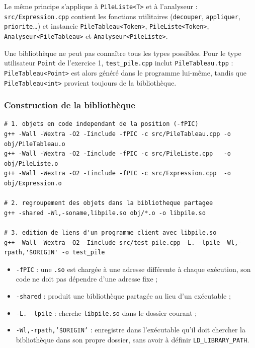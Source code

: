 \documentclass[11pt,a4paper]{article}
\newcommand{\code}[1]{\texttt{#1}}
\begin{document}
Le même principe s'applique à \code{PileListe<T>} et à l'analyseur :
\code{src/Expression.cpp} contient les fonctions utilitaires
(\code{decouper}, \code{appliquer}, \code{priorite}\dots) et instancie
\code{PileTableau<Token>}, \code{PileListe<Token>},
\code{Analyseur<PileTableau>} et \code{Analyseur<PileListe>}.

Une bibliothèque ne peut pas connaître tous les types possibles. Pour le
type utilisateur \code{Point} de l'exercice 1, \code{test\_pile.cpp}
inclut \code{PileTableau.tpp} : \code{PileTableau<Point>} est alors généré
dans le programme lui-même, tandis que \code{PileTableau<int>} provient
toujours de la bibliothèque.

\subsubsection{Construction de la bibliothèque}

\begin{lstlisting}[style=sortie, caption={Étapes de construction (automatisées par le \code{Makefile})}]
# 1. objets en code independant de la position (-fPIC)
g++ -Wall -Wextra -O2 -Iinclude -fPIC -c src/PileTableau.cpp -o obj/PileTableau.o
g++ -Wall -Wextra -O2 -Iinclude -fPIC -c src/PileListe.cpp   -o obj/PileListe.o
g++ -Wall -Wextra -O2 -Iinclude -fPIC -c src/Expression.cpp  -o obj/Expression.o

# 2. regroupement des objets dans la bibliotheque partagee
g++ -shared -Wl,-soname,libpile.so obj/*.o -o libpile.so

# 3. edition de liens d'un programme client avec libpile.so
g++ -Wall -Wextra -O2 -Iinclude src/test_pile.cpp -L. -lpile -Wl,-rpath,'$ORIGIN' -o test_pile
\end{lstlisting}

\begin{itemize}
  \item \code{-fPIC} : une \code{.so} est chargée à une adresse différente
        à chaque exécution, son code ne doit pas dépendre d'une adresse fixe ;
  \item \code{-shared} : produit une bibliothèque partagée au lieu d'un
        exécutable ;
  \item \code{-L. -lpile} : cherche \code{libpile.so} dans le dossier
        courant ;
  \item \code{-Wl,-rpath,'\$ORIGIN'} : enregistre dans l'exécutable qu'il
        doit chercher la bibliothèque dans son propre dossier, sans avoir à
        définir \code{LD\_LIBRARY\_PATH}.
\end{itemize}
\end{document}

